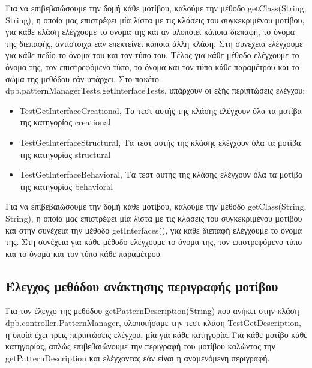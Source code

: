 Για να επιβεβαιώσουμε την δομή κάθε μοτίβου, καλούμε την μέθοδο getClass(String, String), η οποία μας επιστρέφει 
μία λίστα με τις κλάσεις του συγκεκριμένου μοτίβου, για κάθε κλάση ελέγχουμε το όνομα της και αν υλοποιεί κάποια διεπαφή, 
το όνομα της διεπαφής, αντίστοιχα εάν επεκτείνει κάποια άλλη κλάση. Στη συνέχεια ελέγχουμε για κάθε πεδίο το όνομα του και 
τον τύπο του. Τέλος για κάθε μέθοδο ελέγχουμε το όνομα της, τον επιστρεφόμενο τύπο, 
το όνομα και τον τύπο κάθε παραμέτρου και το σώμα της μεθόδου εάν υπάρχει.
\linebreak
Στο πακέτο dpb.patternManagerTests.getInterfaceTests, υπάρχουν οι εξής περιπτώσεις ελέγχου:
\begin{itemize}
    \item TestGetInterfaceCreational, Τα τεστ αυτής της κλάσης ελέγχουν όλα τα μοτίβα της κατηγορίας creational
    \item TestGetInterfaceStructural, Τα τεστ αυτής της κλάσης ελέγχουν όλα τα μοτίβα της κατηγορίας structural
    \item TestGetInterfaceBehavioral, Τα τεστ αυτής της κλάσης ελέγχουν όλα τα μοτίβα της κατηγορίας behavioral
\end{itemize}
Για να επιβεβαιώσουμε την δομή κάθε μοτίβου, καλούμε την μέθοδο getClass(String, String), η οποία μας επιστρέφει 
μία λίστα με τις κλάσεις του συγκεκριμένου μοτίβου και στην συνέχεια την μέθοδο getInterfaces(), για κάθε διεπαφή 
ελέγχουμε το όνομα της. Στη συνέχεια για κάθε μέθοδο ελέγχουμε το όνομα της, τον επιστρεφόμενο τύπο και
το όνομα και τον τύπο κάθε παραμέτρου.
\subsection{Έλεγχος μεθόδου ανάκτησης περιγραφής μοτίβου}
\label{subsec:getDescriptionTest}
Για τον έλεγχο της μεθόδου getPatternDescription(String) που ανήκει στην κλάση dpb.controller.PatternManager, υλοποιήσαμε την τεστ κλάση
TestGetDescription, η οποία έχει τρεις περιπτώσεις ελέγχου, μία για κάθε κατηγορία. Για κάθε μοτίβο κάθε κατηγορίας,
απλώς επιβεβαιώνουμε την περιγραφή του μοτίβου καλώντας την getPatternDescription και ελέγχοντας εάν είναι η αναμενόμενη περιγραφή.
